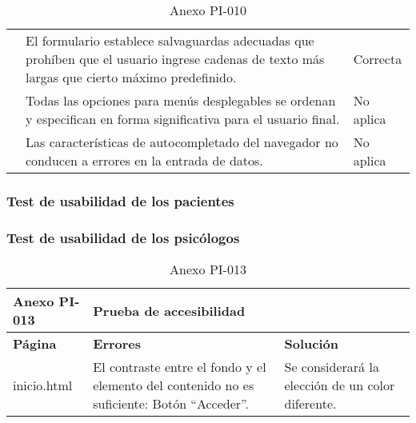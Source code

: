 \begin{table}[htpb]
\begin{tabularx}{\textwidth}{|l|X|l|}
                                      & El formulario establece salvaguardas adecuadas que prohíben que el usuario ingrese cadenas de texto más largas que cierto máximo predefinido.             & Correcta            \\ \cline{2-3} 
                                      & Todas las opciones para menús desplegables se ordenan y especifican en forma significativa para el usuario final.                                         & No aplica           \\ \cline{2-3} 
                                      & Las características de autocompletado del navegador no conducen a errores en la entrada de datos.                                                         & No aplica           \\ \hline
\end{tabularx}
\caption{Anexo PI-010}
\end{table}


\clearpage


\subsubsection{Test de usabilidad de los pacientes}



\newpage


\subsubsection{Test de usabilidad de los psicólogos}



\newpage


\begin{table}[htpb]
\centering
\begin{tabularx}{\textwidth}{|l|X|X|}
\hline
\rowcolor[gray]{0.9}\textbf{Anexo PI-013} & \multicolumn{2}{l|}{\textbf{Prueba de accesibilidad}}                                                                                          \\ \hline
\textbf{Página}       & \textbf{Errores}                                                                           & \textbf{Solución}                                 \\ \hline
inicio.html           & El contraste entre el fondo y el elemento del contenido no es suficiente: Botón “Acceder”. & Se considerará la elección de un color diferente. \\ \hline
\end{tabularx}
\caption{Anexo PI-013}
\end{table}


